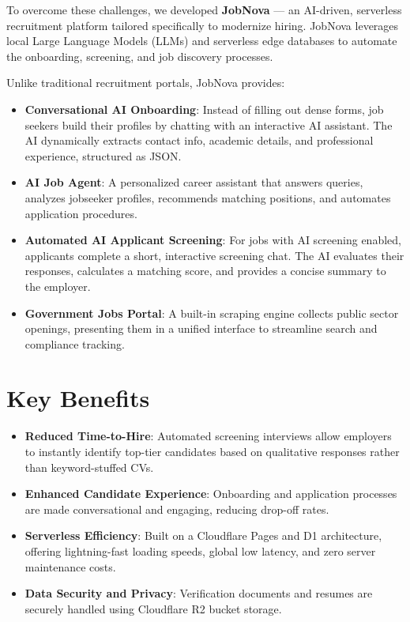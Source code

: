 \documentclass[12pt,a4paper]{report}
\begin{document}
To overcome these challenges, we developed \textbf{JobNova} --- an AI-driven, serverless recruitment platform tailored specifically to modernize hiring. JobNova leverages local Large Language Models (LLMs) and serverless edge databases to automate the onboarding, screening, and job discovery processes.

Unlike traditional recruitment portals, JobNova provides:
\begin{itemize}
    \item \textbf{Conversational AI Onboarding}: Instead of filling out dense forms, job seekers build their profiles by chatting with an interactive AI assistant. The AI dynamically extracts contact info, academic details, and professional experience, structured as JSON.
    \item \textbf{AI Job Agent}: A personalized career assistant that answers queries, analyzes jobseeker profiles, recommends matching positions, and automates application procedures.
    \item \textbf{Automated AI Applicant Screening}: For jobs with AI screening enabled, applicants complete a short, interactive screening chat. The AI evaluates their responses, calculates a matching score, and provides a concise summary to the employer.
    \item \textbf{Government Jobs Portal}: A built-in scraping engine collects public sector openings, presenting them in a unified interface to streamline search and compliance tracking.
\end{itemize}

\section{Key Benefits}
\begin{itemize}
    \item \textbf{Reduced Time-to-Hire}: Automated screening interviews allow employers to instantly identify top-tier candidates based on qualitative responses rather than keyword-stuffed CVs.
    \item \textbf{Enhanced Candidate Experience}: Onboarding and application processes are made conversational and engaging, reducing drop-off rates.
    \item \textbf{Serverless Efficiency}: Built on a Cloudflare Pages and D1 architecture, offering lightning-fast loading speeds, global low latency, and zero server maintenance costs.
    \item \textbf{Data Security and Privacy}: Verification documents and resumes are securely handled using Cloudflare R2 bucket storage.
\end{itemize}
\end{document}
